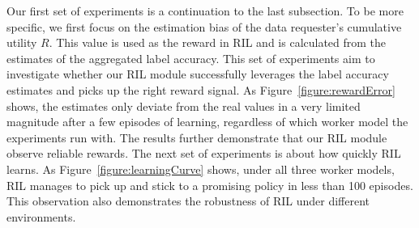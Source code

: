 \documentclass{article}
\newcommand{\com}[1]{\textbf{\color{red}(COMMENT: #1)}} %
\newcommand{\com}[1]{}
\begin{document}
Our first set of experiments is a continuation to the last subsection. To be more specific, we first focus on the estimation bias of the data requester's cumulative utility $R$. This value is used as the reward in RIL and is calculated from the estimates of the aggregated label accuracy.
This set of experiments aim to investigate whether our RIL module successfully leverages the label accuracy estimates and picks up the right reward signal. As Figure~\ref{figure:rewardError} shows, the estimates only deviate from the real values in a very limited magnitude after a few episodes of learning, regardless of which worker model the experiments run with. The results further demonstrate that our RIL module observe reliable rewards. The next set of experiments is about how quickly RIL learns. As Figure~\ref{figure:learningCurve} shows, under all three worker models, RIL manages to pick up and stick to a promising policy %
in less than 100 episodes. 
This observation also demonstrates the robustness of RIL under different environments.

\end{document}
